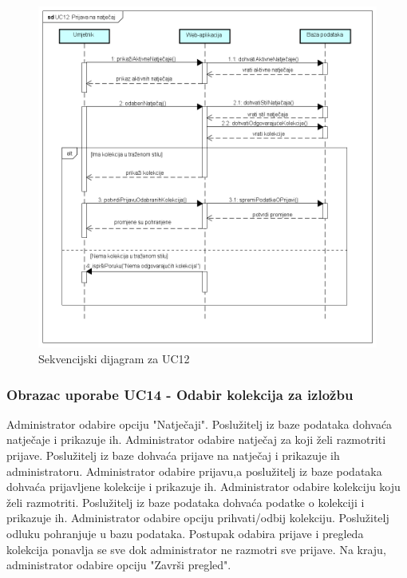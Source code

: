 		\begin{figure}[H]
			
			\includegraphics[width=\textwidth,height=\textheight,keepaspectratio]{sd_uc12}
			\caption{Sekvencijski dijagram za UC12}
			
		\end{figure}
		\eject
		
		\subsubsection{Obrazac uporabe UC14 - Odabir kolekcija za izložbu}
		
		{Administrator odabire opciju "Natječaji". Poslužitelj iz baze podataka dohvaća natječaje i prikazuje ih.
			Administrator odabire natječaj za koji želi razmotriti prijave. Poslužitelj iz baze dohvaća prijave na natječaj
			i prikazuje ih administratoru. Administrator odabire prijavu,a  poslužitelj iz baze podataka dohvaća prijavljene kolekcije
			i prikazuje ih. Administrator odabire kolekciju koju želi razmotriti. Poslužitelj iz baze podataka dohvaća podatke o kolekciji i prikazuje ih. Administrator odabire opciju prihvati/odbij kolekciju. Poslužitelj odluku pohranjuje u bazu podataka. Postupak odabira prijave i pregleda kolekcija ponavlja se sve dok administrator ne razmotri sve prijave. Na kraju, administrator odabire opciju "Završi pregled". }
		
